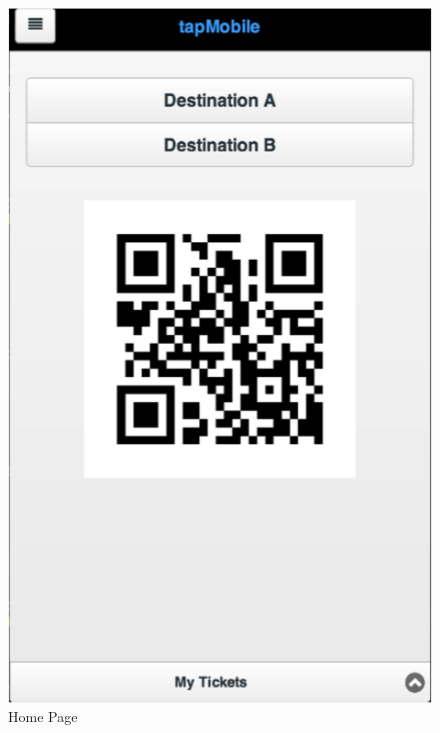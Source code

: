 \begin{figure}
\centering
	\includegraphics[scale=1]{Prototype/home.png}
\caption{Home Page}
\end{figure}

